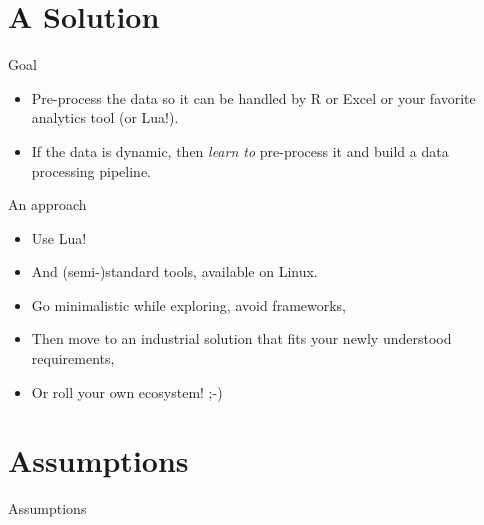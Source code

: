 \documentclass[handout]{beamer}
\begin{document}

\section{A Solution}


\begin{frame}{Goal}

\begin{itemize}
\item Pre-process the data so it can be handled by R or Excel or your favorite
analytics tool (or Lua!).
\item If the data is dynamic, then \textit{learn to} pre-process it
      and build a data processing pipeline.
\end{itemize}

\end{frame}


\begin{frame}{An approach}

\begin{itemize}
\item Use Lua!
\item And (semi-)standard tools, available on Linux.
\item Go minimalistic while exploring, avoid frameworks,
\item Then move to an industrial solution that fits your newly understood
      requirements,
\item Or roll your own ecosystem! ;-)
\end{itemize}

\end{frame}


\section{Assumptions}


\begin{frame}
\huge Assumptions
\end{frame}
\end{document}
